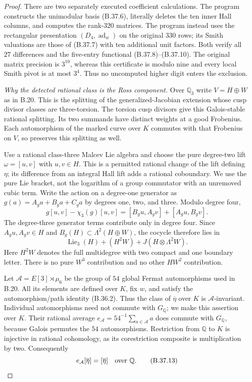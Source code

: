 \begin{proof}
There are two separately executed coefficient calculations.
The program  constructs
the unimodular basis (B.37.6), literally deletes the ten
inner Hall columns, and computes the rank-$320$ matrices.
The program  instead uses
the rectangular presentation $(D_4,\operatorname{ad}_w)$
on the original $330$ rows; its Smith valuations are
those of (B.37.7) with ten additional unit factors.
Both verify all $27$ differences and the five-entry
functional (B.37.8)--(B.37.10).
The original matrix precision is $3^{10}$, whereas this
certificate is modulo nine and every local Smith pivot
is at most $3^4$. Thus no uncomputed higher digit enters
the exclusion.

\emph{Why the detected rational class is the Ross component.}
Over $\mathbb Q_3$ write $V=H\oplus W$ as in B.20.
This is the splitting of the generalized-Jacobian
extension whose cusp divisor classes are three-torsion.
The torsion cusp divisors give this Galois-stable
rational splitting. Its two summands have distinct
weights at a good Frobenius.
Each automorphism of the marked curve over
$K$ commutes with that Frobenius on $V$, so preserves
this splitting as well.

Use a rational class-three Malcev Lie algebra and choose
the pure degree-two lift $\omega=[u,v]$ with $u,v\in H$.
This is a permitted rational change of the lift defining
$\eta$; its difference from an integral Hall lift adds a
rational coboundary. We use the pure Lie bracket, not
the logarithm of a group commutator with an unremoved
cubic term. Write the action on a degree-one generator
as $g(a)=A_ga+B_ga+C_ga$ by degrees one, two, and three.
Modulo degree four,
\[
 g[u,v]-\chi_3(g)[u,v]
             =[B_gu,A_gv]+[A_gu,B_gv].                       \tag{B.37.11}
\]
The degree-three generator terms contribute only in
degree four. Since $A_gu,A_gv\in H$ and
$B_g(H)\subset\Lambda^2(H\oplus W)$, the cocycle
therefore lies in
\[
       \operatorname{Lie}_3(H)
         +(H^2W)+J(H\otimes\Lambda^2W).                      \tag{B.37.12}
\]
Here $H^2W$ denotes the full multidegree with two
compact and one boundary letter. There is no pure
$W^3$ contribution and no other $HW^2$ contribution.

Let $\mathcal A=E[3]\rtimes\mu_6$ be the group of $54$
global Fermat automorphisms used in B.20.
All its elements are defined over $K$, fix $w$, and
satisfy the automorphism/path identity (B.36.2).
Thus the class of $\overline\eta$ over $K$ is
$\mathcal A$-invariant. Individual automorphisms need
not commute with $G_{\mathbb Q}$; we make this assertion
over $K$. Their rational average
$e_{\mathcal A}=54^{-1}\sum_{a\in\mathcal A}a$ does
commute with $G_{\mathbb Q}$, because Galois permutes
the $54$ automorphisms. Restriction from $\mathbb Q$ to
$K$ is injective in rational cohomology, as its
corestriction composite is multiplication by two.
Consequently
\[
                  e_{\mathcal A}[\overline\eta]
                         =[\overline\eta]
              \quad\hbox{over }\mathbb Q.                   \tag{B.37.13}
\]


\end{proof}
